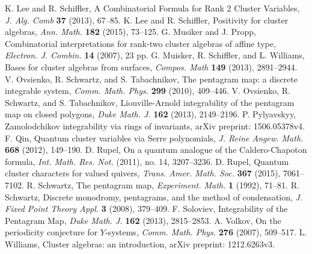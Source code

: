 \documentclass{amsart}
\theoremstyle{definition}
\theoremstyle{remark}
\numberwithin{equation}{section}
\begin{document}
\begin{thebibliography}{99}
   K. Lee and R. Schiffler, A Combinatorial Formula for Rank 2 Cluster Variables, \textsl{J. Alg. Comb} \textbf{37} (2013), 67--85.
   K. Lee and R. Schiffler, Positivity for cluster algebras, \textsl{Ann. Math.} \textbf{182} (2015), 73--125.
	 G. Musiker and J. Propp, Combinatorial interpretations for rank-two cluster algebras of affine type, \textsl{ Electron. J. Combin.} \textbf{14} (2007), 23 pp.
	 G. Muisker, R. Schiffler, and L. Williams, Bases for cluster algebras from surfaces, \textsl{Compos. Math} \textbf{149} (2013), 2891--2944.
	 V. Ovsienko, R. Schwartz, and S. Tabachnikov, The pentagram map: a discrete integrable system, \textsl{Comm. Math. Phys.} \textbf{299} (2010), 409--446.
	 V. Ovsienko, R. Schwartz, and S. Tabachnikov, Liouville-Arnold integrability of the pentagram map on closed polygons, \textsl{Duke Math. J.} \textbf{162} (2013), 2149--2196.
   P. Pylyavskyy, Zamolodchikov integrability via rings of invariants, arXiv preprint: 1506.05378v4.
	 F. Qin, Quantum cluster variables via Serre polynomials, \textsl{J. Reine Angew. Math.} \textbf{668} (2012), 149--190.
   D. Rupel, On a quantum analogue of the Caldero-Chapoton formula, \textsl{Int. Math. Res. Not.} (2011), no. 14, 3207--3236.
   D. Rupel, Quantum cluster characters for valued quivers, \textsl{Trans. Amer. Math. Soc.} \textbf{367} (2015), 7061--7102.
	 R. Schwartz, The pentagram map, \textsl{Experiment. Math.} \textbf{1} (1992), 71--81.
	 R. Schwartz, Discrete monodromy, pentagrams, and the method of condensation, \textsl{J. Fixed Point Theory Appl.} \textbf{3} (2008), 379--409.
	 F. Soloviev, Integrability of the Pentagram Map, \textsl{Duke Math. J.} \textbf{162} (2013), 2815--2853.
	 A. Volkov, On the periodicity conjecture for $Y$-systems, \textsl{Comm. Math. Phys.} \textbf{276} (2007), 509--517.
   L. Williams, Cluster algebras: an introduction, arXiv preprint: 1212.6263v3.
\end{thebibliography}
\end{document}
